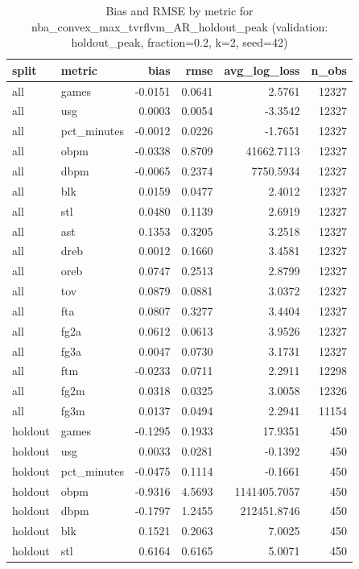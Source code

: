 \begin{table}
\caption{Bias and RMSE by metric for nba_convex_max_tvrflvm_AR_holdout_peak (validation: holdout_peak, fraction=0.2, k=2, seed=42)}
\label{tab:nba_convex_max_tvrflvm_AR_holdout_peak_vs_holdout_peak_f20_k2_s42_bias_rmse}
\begin{tabular}{llrrrr}
\toprule
split & metric & bias & rmse & avg\_log\_loss & n\_obs \\
\midrule
all & games & -0.0151 & 0.0641 & 2.5761 & 12327 \\
all & usg & 0.0003 & 0.0054 & -3.3542 & 12327 \\
all & pct\_minutes & -0.0012 & 0.0226 & -1.7651 & 12327 \\
all & obpm & -0.0338 & 0.8709 & 41662.7113 & 12327 \\
all & dbpm & -0.0065 & 0.2374 & 7750.5934 & 12327 \\
all & blk & 0.0159 & 0.0477 & 2.4012 & 12327 \\
all & stl & 0.0480 & 0.1139 & 2.6919 & 12327 \\
all & ast & 0.1353 & 0.3205 & 3.2518 & 12327 \\
all & dreb & 0.0012 & 0.1660 & 3.4581 & 12327 \\
all & oreb & 0.0747 & 0.2513 & 2.8799 & 12327 \\
all & tov & 0.0879 & 0.0881 & 3.0372 & 12327 \\
all & fta & 0.0807 & 0.3277 & 3.4404 & 12327 \\
all & fg2a & 0.0612 & 0.0613 & 3.9526 & 12327 \\
all & fg3a & 0.0047 & 0.0730 & 3.1731 & 12327 \\
all & ftm & -0.0233 & 0.0711 & 2.2911 & 12298 \\
all & fg2m & 0.0318 & 0.0325 & 3.0058 & 12326 \\
all & fg3m & 0.0137 & 0.0494 & 2.2941 & 11154 \\
holdout & games & -0.1295 & 0.1933 & 17.9351 & 450 \\
holdout & usg & 0.0033 & 0.0281 & -0.1392 & 450 \\
holdout & pct\_minutes & -0.0475 & 0.1114 & -0.1661 & 450 \\
holdout & obpm & -0.9316 & 4.5693 & 1141405.7057 & 450 \\
holdout & dbpm & -0.1797 & 1.2455 & 212451.8746 & 450 \\
holdout & blk & 0.1521 & 0.2063 & 7.0025 & 450 \\
holdout & stl & 0.6164 & 0.6165 & 5.0071 & 450 \\

\end{tabular}
\end{table}
